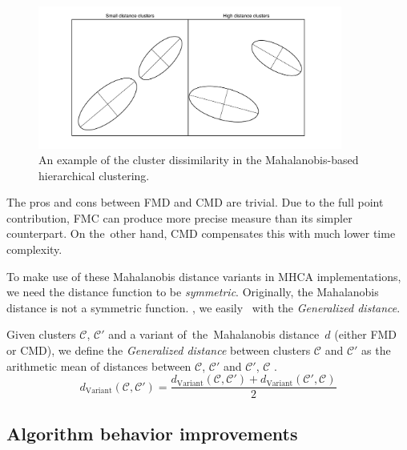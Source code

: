 \begin{figure}\centering
	\includegraphics[width=10cm]{img/ellipses}
	\caption{An example of the cluster dissimilarity in the Mahalanobis-based hierarchical clustering.}
	\label{fig01:ellipses}
\end{figure}



The pros and cons between FMD and CMD are trivial. Due to the full point contribution, FMC can produce more precise measure than its simpler counterpart. On the~other hand, CMD compensates this with much lower time complexity.

\vspace{0.5cm}

To make use of these Mahalanobis distance variants in MHCA implementations, we need the distance function to be \emph{symmetric}. Originally, the Mahalanobis distance is not a symmetric function. , we easily \ with the \emph{Generalized distance}.

\begin{defn}
	Given clusters $\mathcal{C}$, $\mathcal{C}'$ and a variant of~the~Mahalanobis distance~$d$ (either FMD or CMD), we define the \emph{Generalized distance} between clusters $\mathcal{C}$ and $\mathcal{C}'$ as the arithmetic mean of distances between $\mathcal{C}$, $\mathcal{C}'$ and $\mathcal{C}'$, $\mathcal{C}$ .
	\begin{equation}\label{eq01:gene}
	d_\text{Variant}(\mathcal{C},\mathcal{C}') = \frac{d_\text{Variant}(\mathcal{C},\mathcal{C}')+d_\text{Variant}(\mathcal{C}',\mathcal{C})}{2}
	\end{equation}
	\label{def01:gene}
\end{defn}  


\subsection{Algorithm behavior improvements}

